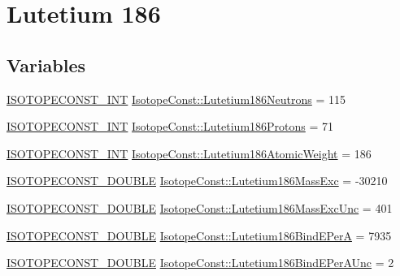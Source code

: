\hypertarget{group___isotope_const-_lutetium-_lu186}{}\section{Lutetium 186}
\label{group___isotope_const-_lutetium-_lu186}
\subsection*{Variables}
\begin{DoxyCompactItemize}
\item 
\mbox{\hyperlink{group___isotope_const-_macros_ga5f18360b3e99483a35c32d789e62621c}{I\+S\+O\+T\+O\+P\+E\+C\+O\+N\+S\+T\+\_\+\+I\+NT}} \mbox{\hyperlink{group___isotope_const-_lutetium-_lu186_gac7800626cb28874dd62c596f6a9700ba}{Isotope\+Const\+::\+Lutetium186\+Neutrons}} = 115
\item 
\mbox{\hyperlink{group___isotope_const-_macros_ga5f18360b3e99483a35c32d789e62621c}{I\+S\+O\+T\+O\+P\+E\+C\+O\+N\+S\+T\+\_\+\+I\+NT}} \mbox{\hyperlink{group___isotope_const-_lutetium-_lu186_ga9a18ff45c684b7f964d20f26d949c253}{Isotope\+Const\+::\+Lutetium186\+Protons}} = 71
\item 
\mbox{\hyperlink{group___isotope_const-_macros_ga5f18360b3e99483a35c32d789e62621c}{I\+S\+O\+T\+O\+P\+E\+C\+O\+N\+S\+T\+\_\+\+I\+NT}} \mbox{\hyperlink{group___isotope_const-_lutetium-_lu186_ga2f85d48e51a560d43a44b628db7eadae}{Isotope\+Const\+::\+Lutetium186\+Atomic\+Weight}} = 186
\item 
\mbox{\hyperlink{group___isotope_const-_macros_ga8f45a7272ce02c0b4c65c44636ed719a}{I\+S\+O\+T\+O\+P\+E\+C\+O\+N\+S\+T\+\_\+\+D\+O\+U\+B\+LE}} \mbox{\hyperlink{group___isotope_const-_lutetium-_lu186_ga6c342c573c749494b54d266f971c7a14}{Isotope\+Const\+::\+Lutetium186\+Mass\+Exc}} = -\/30210
\item 
\mbox{\hyperlink{group___isotope_const-_macros_ga8f45a7272ce02c0b4c65c44636ed719a}{I\+S\+O\+T\+O\+P\+E\+C\+O\+N\+S\+T\+\_\+\+D\+O\+U\+B\+LE}} \mbox{\hyperlink{group___isotope_const-_lutetium-_lu186_gaed4326705034ff63b14eca4700663568}{Isotope\+Const\+::\+Lutetium186\+Mass\+Exc\+Unc}} = 401
\item 
\mbox{\hyperlink{group___isotope_const-_macros_ga8f45a7272ce02c0b4c65c44636ed719a}{I\+S\+O\+T\+O\+P\+E\+C\+O\+N\+S\+T\+\_\+\+D\+O\+U\+B\+LE}} \mbox{\hyperlink{group___isotope_const-_lutetium-_lu186_gab1cf0668c3d8ec395f9989dd304d9f2a}{Isotope\+Const\+::\+Lutetium186\+Bind\+E\+PerA}} = 7935
\item 
\mbox{\hyperlink{group___isotope_const-_macros_ga8f45a7272ce02c0b4c65c44636ed719a}{I\+S\+O\+T\+O\+P\+E\+C\+O\+N\+S\+T\+\_\+\+D\+O\+U\+B\+LE}} \mbox{\hyperlink{group___isotope_const-_lutetium-_lu186_ga79e0b36359e19bee8946f09a5c21510e}{Isotope\+Const\+::\+Lutetium186\+Bind\+E\+Per\+A\+Unc}} = 2

\end{DoxyCompactItemize}
